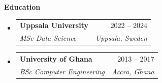 \documentclass[a4paper,12pt]{article}[leftmargin=*]
\makeatletter
\def \entryspacing {-0pt}
\renewcommand{\section}[2]{\vspace{5pt}
  \colorbox{secondary}{\color{white}\raggedbottom\normalsize\textbf{{#1}{\hspace{7pt}#2}}}
}
\newcommand{\resumeEntryStart}{\begin{itemize}[leftmargin=2.5mm]}
\newcommand{\resumeEntryEnd}{\end{itemize}\vspace{\entryspacing}}
\newcommand{\resumeEntryTSDL}[4]{
  \vspace{-1pt}\item[]
    \begin{tabularx}{0.99\textwidth}{X@{\hspace{60pt}}r}
      \textbf{\color{primary}#1} & {\firabook\color{accent}\small#2} \\
      \textit{\color{accent}\small#3} & \textit{\color{accent}\small#4} \\
    \end{tabularx}\vspace{-7pt}
}
\makeatother
\begin{document}
\vspace{2pt}
\section{\faGraduationCap}{Education}
  \resumeEntryStart
    \vspace{-10pt}
    \resumeEntryTSDL
      {Uppsala University}{2022 -- 2024}
      {MSc Data Science}
      {Uppsala, Sweden}
  \resumeEntryEnd
  \resumeEntryStart
    \vspace{-10pt}
    \resumeEntryTSDL
      {University of Ghana}{2013 -- 2017}
      {BSc Computer Engineering}
      {Accra, Ghana}
  \resumeEntryEnd
\end{document}
